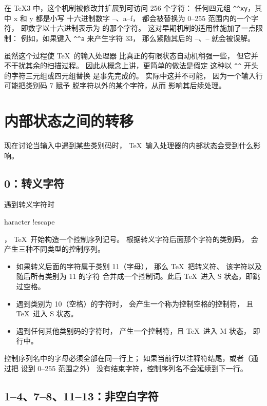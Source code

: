 \documentclass[a4paper]{rapport3}
\def\term#1\par{\index{#1}}
\begin{document}
在 \TeX3 中，这个机制被修改并扩展到可访问 256 个字符：
任何四元组 \verb-^^xy-，其中 \n x 和 \n y 都是小写
十六进制数字 --、\n a--\n f，
都会被替换为 0--255 范围内的一个字符，
即数字以十六进制表示为  的那个字符。
这对早期机制的适用性施加了一点限制：
例如，如果键入 \verb>^^a> 来产生字符 33，
那么紧随其后的 --、-- 就会被误解。

虽然这个过程使 \TeX\ 的输入处理器
比真正的有限状态自动机稍强一些，
但它并不干扰其余的扫描过程。
因此从概念上讲，更简单的做法是假定
这种以 \verb>^^> 开头的字符三元组或四元组替换
是事先完成的。
实际中这并不可能，
因为一个输入行可能把类别码 7 赋予
脱字符以外的某个字符，从而
影响其后续处理。


\section{内部状态之间的转移}

现在讨论当输入中遇到某些类别码时，
\TeX\ 输入处理器的内部状态会受到什么影响。

\subsection{0：转义字符}

遇到转义字符时\term character !escape\par，
\TeX\ 开始构造一个控制序列记号。
根据转义字符后面那个字符的类别码，
会产生三种不同类型的控制序列。

\begin{itemize}\item
如果转义后面的字符属于类别 11（字母），
那么 \TeX\ 把转义符、
该字符以及随后所有类别为 11 的字符
合并成一个控制词。此后 \TeX\
进入 {\italic S} 状态，即跳过空格。
\item
遇到类别为 10（空格）的字符时，
会产生一个称为控制空格的控制符，
且 \TeX\ 进入 {\italic S} 状态。
\item
遇到任何其他类别码的字符时，
产生一个控制符，且 \TeX\ 进入 {\italic M} 状态，
即行中。
\end{itemize}

控制序列名中的字母必须全部在同一行上；
如果当前行以注释符结尾，或者（通过把
 设到 0--255 范围之外）
没有结束字符，控制序列名不会延续到下一行。

\subsection{1--4、7--8、11--13：非空白字符}
\end{document}
